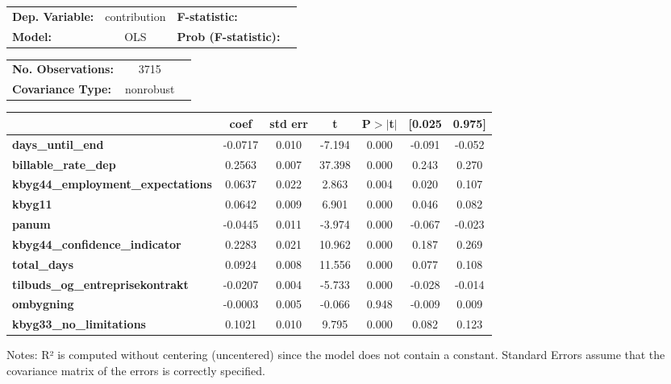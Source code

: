 \begin{center}
\begin{tabular}{lclc}
\toprule
\textbf{Dep. Variable:}                   &  contribution & \textbf{  F-statistic:       }  \\
\textbf{Model:}                           &      OLS      & \textbf{  Prob (F-statistic):}  \\
\bottomrule
\end{tabular}
\begin{tabular}{lcl}
\textbf{No. Observations:}                &       3715    & \textbf{                     }  \\
\textbf{Covariance Type:}                 &   nonrobust   & \textbf{                     }  \\
\bottomrule
\end{tabular}
\begin{tabular}{lcccccc}
                                          & \textbf{coef} & \textbf{std err} & \textbf{t} & \textbf{P$> |$t$|$} & \textbf{[0.025} & \textbf{0.975]}  \\
\midrule
\textbf{days\_until\_end}                 &      -0.0717  &        0.010     &    -7.194  &         0.000        &       -0.091    &       -0.052     \\
\textbf{billable\_rate\_dep}              &       0.2563  &        0.007     &    37.398  &         0.000        &        0.243    &        0.270     \\
\textbf{kbyg44\_employment\_expectations} &       0.0637  &        0.022     &     2.863  &         0.004        &        0.020    &        0.107     \\
\textbf{kbyg11}                           &       0.0642  &        0.009     &     6.901  &         0.000        &        0.046    &        0.082     \\
\textbf{panum}                            &      -0.0445  &        0.011     &    -3.974  &         0.000        &       -0.067    &       -0.023     \\
\textbf{kbyg44\_confidence\_indicator}    &       0.2283  &        0.021     &    10.962  &         0.000        &        0.187    &        0.269     \\
\textbf{total\_days}                      &       0.0924  &        0.008     &    11.556  &         0.000        &        0.077    &        0.108     \\
\textbf{tilbuds\_og\_entreprisekontrakt}  &      -0.0207  &        0.004     &    -5.733  &         0.000        &       -0.028    &       -0.014     \\
\textbf{ombygning}                        &      -0.0003  &        0.005     &    -0.066  &         0.948        &       -0.009    &        0.009     \\
\textbf{kbyg33\_no\_limitations}          &       0.1021  &        0.010     &     9.795  &         0.000        &        0.082    &        0.123     \\
\bottomrule
\end{tabular}
\end{center}

Notes: \newline
 [1] R² is computed without centering (uncentered) since the model does not contain a constant. \newline
 [2] Standard Errors assume that the covariance matrix of the errors is correctly specified.